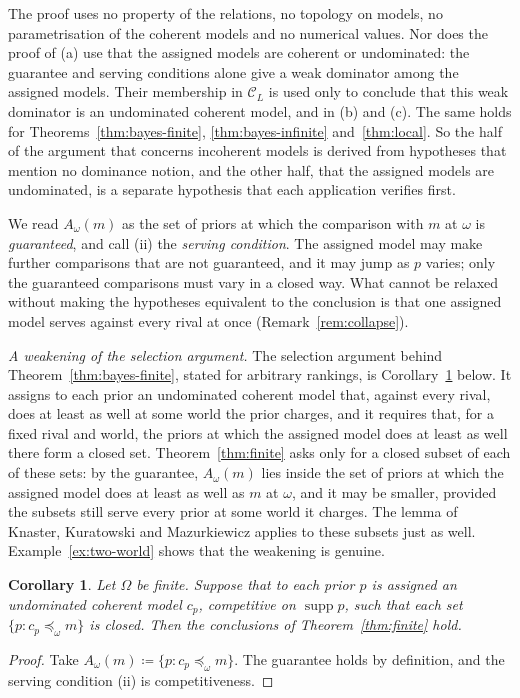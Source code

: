 \documentclass[11pt]{article}
\newtheorem{corollary}[theorem]{Corollary}
\theoremstyle{definition}
\theoremstyle{remark}
\newcommand{\C}{\mathcal C}
\newcommand{\supp}{\operatorname{supp}}
\begin{document}
The proof uses no property of the relations, no topology on models, no parametrisation of the coherent models and no numerical values. Nor does the proof of (a) use that the assigned models are coherent or undominated: the guarantee and serving conditions alone give a weak dominator among the assigned models. Their membership in $\C_L$ is used only to conclude that this weak dominator is an undominated coherent model, and in (b) and (c). The same holds for Theorems~\ref{thm:bayes-finite}, \ref{thm:bayes-infinite} and~\ref{thm:local}. So the half of the argument that concerns incoherent models is derived from hypotheses that mention no dominance notion, and the other half, that the assigned models are undominated, is a separate hypothesis that each application verifies first.

We read $A_\omega(m)$ as the set of priors at which the comparison with $m$ at $\omega$ is \emph{guaranteed}, and call (ii) the \emph{serving condition}. The assigned model may make further comparisons that are not guaranteed, and it may jump as $p$ varies; only the guaranteed comparisons must vary in a closed way. What cannot be relaxed without making the hypotheses equivalent to the conclusion is that one assigned model serves against every rival at once (Remark~\ref{rem:collapse}).

\emph{A weakening of the selection argument.} The selection argument behind Theorem~\ref{thm:bayes-finite}, stated for arbitrary rankings, is Corollary~\ref{cor:closed-choice} below. It assigns to each prior an undominated coherent model that, against every rival, does at least as well at some world the prior charges, and it requires that, for a fixed rival and world, the priors at which the assigned model does at least as well there form a closed set. Theorem~\ref{thm:finite} asks only for a closed subset of each of these sets: by the guarantee, $A_\omega(m)$ lies inside the set of priors at which the assigned model does at least as well as $m$ at $\omega$, and it may be smaller, provided the subsets still serve every prior at some world it charges. The lemma of Knaster, Kuratowski and Mazurkiewicz applies to these subsets just as well. Example~\ref{ex:two-world} shows that the weakening is genuine.

\begin{corollary}\label{cor:closed-choice}
Let $\Omega$ be finite. Suppose that to each prior $p$ is assigned an undominated coherent model $c_p$, competitive on $\supp p$, such that each set $\{p:c_p\preceq_\omega m\}$ is closed. Then the conclusions of Theorem~\ref{thm:finite} hold.
\end{corollary}
\begin{proof}
Take $A_\omega(m)\coloneqq\{p:c_p\preceq_\omega m\}$. The guarantee holds by definition, and the serving condition (ii) is competitiveness.
\end{proof}
\end{document}
